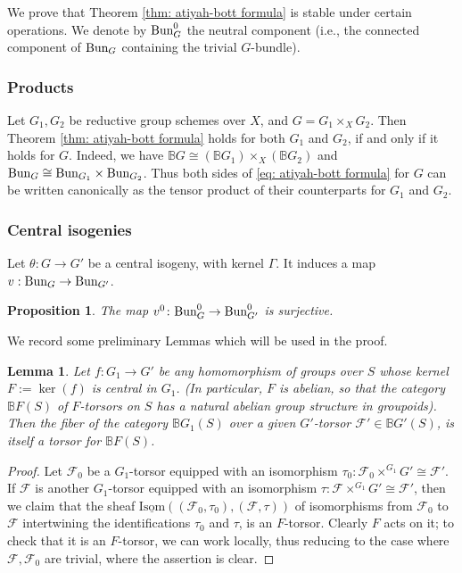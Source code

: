 \documentclass[reqno]{amsart}
\numberwithin{equation}{subsection}
\newtheorem{lemma}[subsubsection]{Lemma}
\newtheorem{prop}[subsubsection]{Proposition}
\theoremstyle{definition}
\def\BB{\mathbb{B}}
\newcommand\cF{\mathcal{F}}
\newcommand{\Bun}{\textup{Bun}}
\newcommand{\ul}[1]{\underline{#1}}
\newcommand{\mrm}[1]{\mathrm{#1}}
\newcommand{\co}{\colon}
\begin{document}
We prove that Theorem \ref{thm: atiyah-bott formula} is stable under certain operations. %
We denote by $\Bun_G^0$ the neutral component (i.e., the connected component of $\Bun_{G}$ containing the trivial $G$-bundle).

\subsubsection{Products}\label{sssec: AB products} Let $G_{1}, G_{2}$ be reductive group schemes over $X$, and $G=G_{1}\times _{X}G_{2}$. Then Theorem \ref{thm: atiyah-bott formula} holds for both $G_1$ and $G_2$, if and only if it holds for $G$. Indeed, we have $\BB G\cong (\BB G_1) \times_X (\BB G_2)$ and $\Bun_{G} \cong \Bun_{G_1} \times \Bun_{G_2}$. Thus both sides of \eqref{eq: atiyah-bott formula} for $G$ can be written canonically as the tensor product of their counterparts for $G_{1}$ and $G_{2}$.



\subsubsection{Central isogenies}\label{sss:AB central isog}
Let $\theta \colon G \rightarrow G'$ be a central isogeny, with kernel $\Gamma$. It induces a map $v: \Bun_G \rightarrow \Bun_{G'}$.

\begin{prop}\label{prop:map-bun-surjective}
The map $v^0\colon\Bun_G^0 \rightarrow \Bun_{G'}^0$ is surjective.
\end{prop}


We record some preliminary Lemmas which will be used in the proof. 

\begin{lemma}\label{lem:torsors-fiber} Let $f \co G_1 \rightarrow G'$ be any homomorphism of groups over $S$ whose kernel $F := \ker(f)$ is central in $G_1$. (In particular, $F$ is abelian, so that the category $\BB F(S)$ of $F$-torsors on $S$ has a natural abelian group structure in groupoids). Then the fiber of the category $\BB G_1(S)$ over a given $G'$-torsor $\cF' \in \BB G'(S)$, is itself a torsor for $\BB F(S)$. 
\end{lemma}

\begin{proof}
Let $\cF_0$ be a $G_1$-torsor equipped with an isomorphism $\tau_0 \co \cF_0 \times^{G_1} G' \cong \cF'$. If $\cF$ is another $G_1$-torsor equipped with an isomorphism $\tau \co \cF \times^{G_1} G' \cong \cF'$, then we claim that the sheaf $\ul{\mrm{Isom}}((\cF_0, \tau_0), (\cF, \tau))$ of isomorphisms from $\cF_0$ to $\cF$ intertwining the identifications $\tau_0$ and $\tau$, is an $F$-torsor. Clearly $F$ acts on it; to check that it is an $F$-torsor, we can work locally, thus reducing to the case where $\cF, \cF_0$ are trivial, where the assertion is clear. 
\end{proof}
\end{document}
